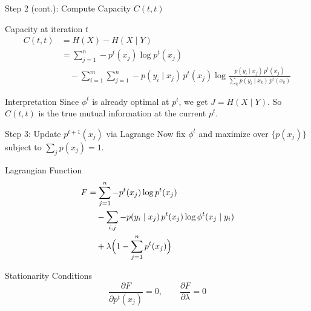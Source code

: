\documentclass{beamer}
\begin{document}
\begin{frame}{Step 2 (cont.): Compute Capacity $C(t,t)$}
    \begin{block}{Capacity at iteration $t$}
        \begin{align*}
            C(t,t) &= H(X) - H(X \mid Y) \\
                   &= \sum_{j=1}^{n} -p^t(x_j) \log p^t(x_j) \\
                   &\quad - \sum_{i=1}^{m}\sum_{j=1}^{n} -p(y_i \mid x_j)\, p^t(x_j) \log \frac{p(y_i\mid x_j)\, p^t(x_j)}{\sum_k p(y_i \mid x_k)\, p^t(x_k)}
        \end{align*}
    \end{block}

    \begin{exampleblock}{Interpretation}
        Since $\phi^t$ is already optimal at $p^t$, we get $J = H(X \mid Y)$. So $C(t,t)$ is the true mutual information at the current $p^t$.
    \end{exampleblock}
\end{frame}

\begin{frame}{Step 3: Update $p^{t+1}(x_j)$ via Lagrange}
    Now fix $\phi^t$ and maximize over $\{p(x_j)\}$ subject to $\sum_j p(x_j) = 1$.

    \begin{block}{Lagrangian Function}
        \begin{align*}
            F &= \sum_{j=1}^n -p^t(x_j) \log p^t(x_j) \\
              &\quad - \sum_{i,j} -p(y_i \mid x_j)\, p^t(x_j) \log \phi^t(x_j \mid y_i) \\
              &\quad + \lambda \Bigl( 1 - \sum_{j=1}^{n} p^t(x_j) \Bigr)
        \end{align*}
    \end{block}

    \begin{block}{Stationarity Conditions}
        $$
            \frac{\partial F}{\partial p^t(x_j)} = 0, \qquad \frac{\partial F}{\partial \lambda} = 0
        $$
    \end{block}
\end{frame}
\end{document}
